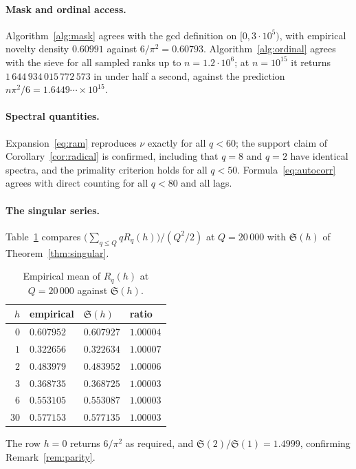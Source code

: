 \documentclass[11pt,a4paper]{article}
\theoremstyle{plain}
\theoremstyle{definition}
\theoremstyle{remark}
\begin{document}
\paragraph{Mask and ordinal access.} Algorithm~\ref{alg:mask} agrees with the
gcd definition on $[0, 3\cdot 10^5)$, with empirical novelty density
$0.60991$ against $6/\pi^2 = 0.60793$. Algorithm~\ref{alg:ordinal} agrees with
the sieve for all sampled ranks up to $n = 1.2\cdot10^6$; at
$n = 10^{15}$ it returns $1\,644\,934\,015\,772\,573$ in under half a second,
against the prediction $n\pi^2/6 = 1.6449\cdots\times10^{15}$.

\paragraph{Spectral quantities.} Expansion~\eqref{eq:ram} reproduces $\nu$
exactly for all $q < 60$; the support claim of Corollary~\ref{cor:radical} is
confirmed, including that $q = 8$ and $q = 2$ have identical spectra, and the
primality criterion holds for all $q < 50$. Formula~\eqref{eq:autocorr} agrees
with direct counting for all $q < 80$ and all lags.

\paragraph{The singular series.} Table~\ref{tab:singular} compares
$\bigl(\sum_{q\le Q} q R_q(h)\bigr)/(Q^2/2)$ at $Q = 20\,000$ with
$\mathfrak{S}(h)$ of Theorem~\ref{thm:singular}.

\begin{table}[h]
\centering
\caption{Empirical mean of $R_q(h)$ at $Q = 20\,000$ against $\mathfrak{S}(h)$.}
\label{tab:singular}
\begin{tabular}{rlll}
\toprule
$h$ & empirical & $\mathfrak{S}(h)$ & ratio \\
\midrule
$0$  & $0.607952$ & $0.607927$ & $1.00004$ \\
$1$  & $0.322656$ & $0.322634$ & $1.00007$ \\
$2$  & $0.483979$ & $0.483952$ & $1.00006$ \\
$3$  & $0.368735$ & $0.368725$ & $1.00003$ \\
$6$  & $0.553105$ & $0.553087$ & $1.00003$ \\
$30$ & $0.577153$ & $0.577135$ & $1.00003$ \\
\bottomrule
\end{tabular}
\end{table}

The row $h=0$ returns $6/\pi^2$ as required, and
$\mathfrak{S}(2)/\mathfrak{S}(1) = 1.4999$, confirming
Remark~\ref{rem:parity}.
\end{document}
